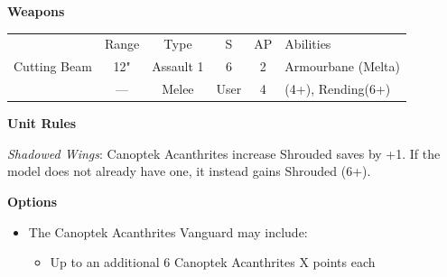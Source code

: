 \begin{minipage}[t]{0.72\textwidth}
	\vspace*{2em}
	\textbf{Weapons}
	
	\begin{tabular}{m{95 pt} *{4}{c} >{\raggedright\arraybackslash}p{130pt}}
		& Range & Type & S & AP & Abilities \\
		Cutting Beam & 12" & Assault 1 & 6 & 2 & Armourbane (Melta) \\
		\quickref{Voidblade} & — & Melee & User & 4 & \quickref{Entropic Strike} (4+), Rending(6+) \\
	\end{tabular}
	
	\vspace*{2em}
	\textbf{Unit Rules}
	
	\textit{Shadowed Wings}: Canoptek Acanthrites increase Shrouded saves by +1. If the model does not already have one, it instead gains Shrouded (6+).
		
	\vspace*{2em}
	\textbf{Options}
	\begin{itemize}
		\item The Canoptek Acanthrites Vanguard may include:
		\begin{itemize}
			\item Up to an additional 6 Canoptek Acanthrites \dotfill X points each
		\end{itemize}
	\end{itemize}
\end{minipage}


\newpage
\subsubsection[Canoptek Scarab Swarms]{}

